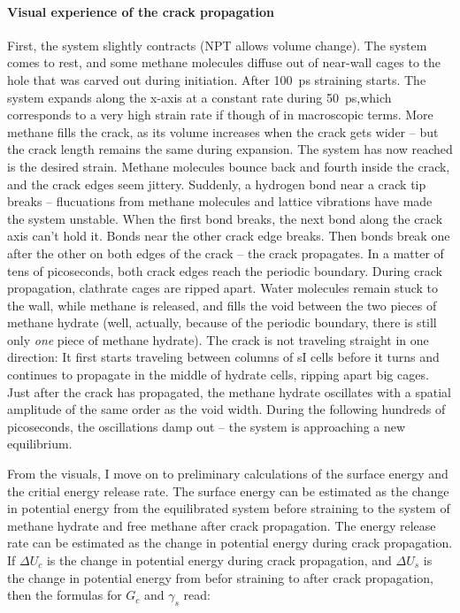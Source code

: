 \begin{framed}
\paragraph{Visual experience of the crack propagation}
First, the system slightly contracts (NPT allows volume change). The system comes to rest, and some methane molecules diffuse out of near-wall cages to the hole that was carved out during initiation. After \SI{100}{\pico\second} straining starts. The system expands along the x-axis at a constant rate during \SI{50}{\pico\second},which corresponds to a very high strain rate if though of in macroscopic terms. More methane fills the crack, as its volume increases when the crack gets wider -- but the crack length remains the same during expansion. The system has now reached is the desired strain. Methane molecules bounce back and fourth inside the crack, and the crack edges seem jittery. Suddenly, a hydrogen bond near a crack tip breaks -- flucuations from methane molecules and lattice vibrations have made the system unstable. When the first bond breaks, the next bond along the crack axis can't hold it. Bonds near the other crack edge breaks. Then bonds break one after the other on both edges of the crack -- the crack propagates. In a matter of tens of picoseconds, both crack edges reach the periodic boundary. During crack propagation, clathrate cages are ripped apart. Water molecules remain stuck to the wall, while methane is released, and fills the void between the two pieces of methane hydrate (well, actually, because of the periodic boundary, there is still only \emph{one} piece of methane hydrate). The crack is not traveling straight in one direction: It first starts traveling between columns of sI cells before it turns and continues to propagate in the middle of hydrate cells, ripping apart big cages. Just after the crack has propagated, the methane hydrate oscillates with a spatial amplitude of the same order as the void width. During the following hundreds of picoseconds, the oscillations damp out -- the system is approaching a new equilibrium.
\end{framed}

From the visuals, I move on to preliminary calculations of the surface energy and the critial energy release rate. The surface energy can be estimated as the change in potential energy from the equilibrated system before straining to the system of methane hydrate and free methane after crack propagation. The energy release rate can be estimated as the change in potential energy during crack propagation. If $\Delta U_c$ is the change in potential energy during crack propagation, and $\Delta U_s$ is the change in potential energy from befor straining to after crack propagation, then the formulas for $G_c$ and $\gamma_s$ read:

